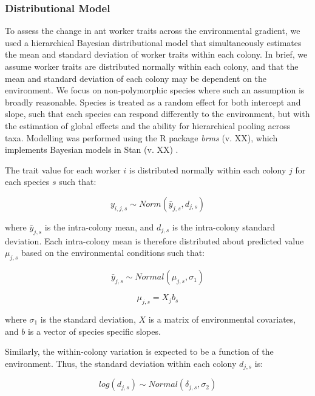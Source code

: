 \documentclass[review,preprint,3p]{elsarticle}
\begin{document}
	\subsubsection{Distributional Model}
	To assess the change in ant worker traits across the environmental gradient, we used a hierarchical Bayesian distributional model that simultaneously estimates the mean and standard deviation of worker traits within each colony. In brief, we assume worker traits are distributed normally within each colony, and that the mean and standard deviation of each colony may be dependent on the environment. We focus on non-polymorphic species where such an assumption is broadly reasonable. Species is treated as a random effect for both intercept and slope, such that each species can respond differently to the environment, but with the estimation of global effects and the ability for hierarchical pooling across taxa. Modelling was performed using the R package \emph{brms} (v. XX), which implements Bayesian models in Stan (v. XX) .
	
	The trait value for each worker $i$ is distributed normally within each colony $j$ for each species $s$ such that:
	
	\begin{equation}
		y_{i,j,s} \sim Norm(\bar{y}_{j,s}, d_{j,s})
	\end{equation}
	
	where $\bar{y}_{j,s}$ is the intra-colony mean, and $d_{j,s}$ is the intra-colony standard deviation. Each intra-colony mean is therefore distributed about predicted value $\mu_{j,s}$ based on the environmental conditions such that:
	
	\begin{equation}
		\bar{y}_{j,s} \sim Normal(\mu_{j,s}, \sigma_{1})
	\end{equation}
	
	\begin{equation}
		\mu_{j,s} = X_j b_s
	\end{equation}
	
	where $\sigma_{1}$ is the standard deviation, $X$ is a matrix of environmental covariates, and $b$ is a vector of species specific slopes.  
	
	Similarly, the within-colony variation is expected to be a function of the environment. Thus, the standard deviation within each colony $d_{j,s}$ is:
	
	\begin{equation}
		log(d_{j,s}) \sim Normal(\delta_{j,s}, \sigma_{2})
	\end{equation}
	
\end{document}
